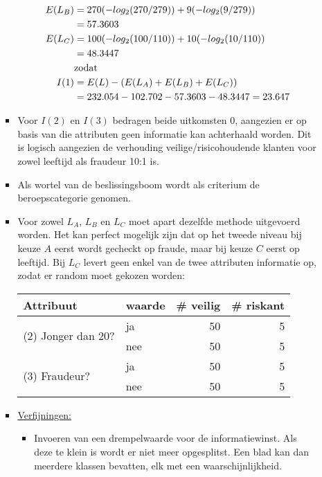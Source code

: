 \begin{itemize}
\begin{itemize}
\begin{itemize}
\begin{equation*}
\begin{split}
							     E(L_B) & = 270(-log_2(270/279)) + 9(-log_2(9/279))\\
							     		&  = 57.3603 \\
							     E(L_C) & = 100(-log_2(100/110)) + 10(-log_2(10/110)) \\
									     & = 48.3447\\ 
									     & \hbox{zodat} \\
							I(1) & =  E(L) - (E(L_A) + E(L_B) + E(L_C)) \\
							 	 & = 232.054 - 102.702 - 57.3603 - 48.3447 = 23.647							         	     
						\end{split}
					\end{equation*}
					\item Voor $I(2)$ en $I(3)$ bedragen beide uitkomsten $0$, aangezien er op basis van die attributen geen informatie kan achterhaald worden. Dit is logisch aangezien de verhouding veilige/risicohoudende klanten voor zowel leeftijd als fraudeur 10:1 is.
					\item Als wortel van de beslissingsboom wordt als criterium de beroepscategorie genomen.
					\item Voor zowel $L_A$, $L_B$ en $L_C$ moet apart dezelfde methode uitgevoerd worden. Het kan perfect mogelijk zijn dat op het tweede niveau bij keuze $A$ eerst wordt gecheckt op fraude, maar bij keuze $C$ eerst op leeftijd. 
					\alert Bij $L_C$ levert geen enkel van de twee attributen informatie op, zodat er random moet gekozen worden:
					\begin{table}[ht]
						\centering
						\begin{tabular}{|l | l |rr|}
							\hline	
							Attribuut & waarde & \# veilig & \# riskant \\
							\hline	
							\multirow{2}{*}{(2) Jonger dan 20?} & ja & 50 & 5 \\
							& nee & 50 & 5 \\
							\hline	
							\multirow{2}{*}{(3) Fraudeur?} & ja & 50 & 5 \\
							& nee & 50 & 5 \\
							\hline			
						\end{tabular}
					\end{table}
					\item \underline{Verfijningen:}
					\begin{itemize}
						\item Invoeren van een drempelwaarde voor de informatiewinst. Als deze te klein is wordt er niet meer opgesplitst. Een blad kan dan meerdere klassen bevatten, elk met een waarschijnlijkheid.

\end{itemize}
\end{itemize}
\end{itemize}
\end{itemize}
